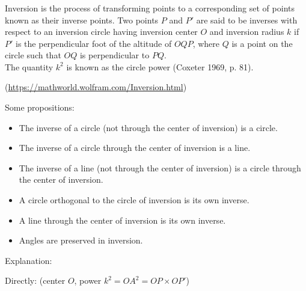 \subsubsection{}

Inversion is the process of transforming points to a corresponding set of points known as their inverse points. Two points $P$ and $P'$ are said to be inverses with respect to an inversion circle having inversion center $O$ and inversion radius $k$ if $P'$ is the perpendicular foot of the altitude of $OQP$, where  $Q$ is a point on the circle such that $OQ$ is perpendicular to $PQ$.\\
 The quantity $k^2$ is known as the circle power (Coxeter 1969, p. 81).
 
(\url{https://mathworld.wolfram.com/Inversion.html})

Some propositions:
\begin{itemize}
\item The inverse of a circle (not through the center of inversion) is a circle.
\item The inverse of a circle through the center of inversion is a line.
\item The inverse of a line (not through the center of inversion) is a circle through the center of inversion.
\item A circle orthogonal to the circle of inversion is its own inverse.
\item A line through the center of inversion is its own inverse.
\item Angles are preserved in inversion.
\end{itemize}

Explanation:

Directly:
(center $O$, power $k^2={OA}^2=OP \times OP'$)

\begin{tkzexample}[latex=6cm,small]
\end{tkzexample} 

